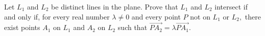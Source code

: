 Let $L_1$ and $L_2$ be distinct lines in the plane. Prove that $L_1$ and $L_2$ intersect if and only if, for every real number $\lambda\ne 0$ and every point $P$ not on $L_1$ or $L_2,$ there exist points $A_1$ on $L_1$ and $A_2$ on $L_2$ such that $\overrightarrow{PA_2}=\lambda\overrightarrow{PA_1}.$